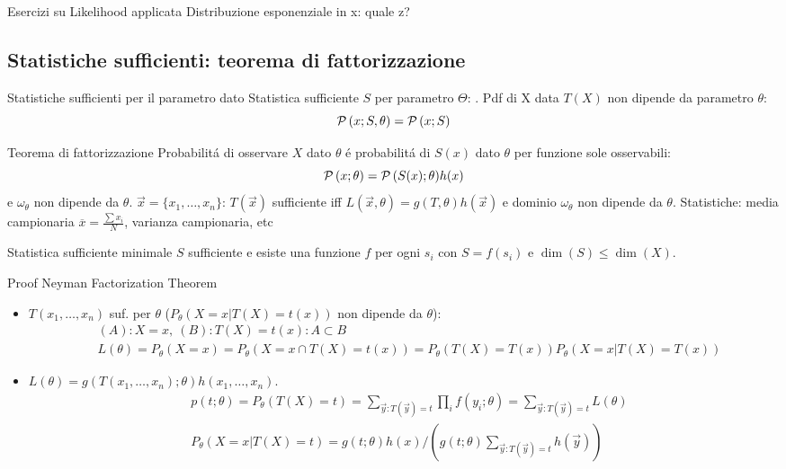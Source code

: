 \documentclass[asd-beamer.tex]{subfiles}
\begin{document}
\begin{frame}{Esercizi su Likelihood applicata}
Distribuzione esponenziale in x: quale z?
\end{frame}

\subsection{Statistiche sufficienti: teorema di fattorizzazione}

\begin{frame}{Statistiche sufficienti per il parametro dato}
Statistica sufficiente $S$ per parametro $\Theta$: . Pdf di X data $T(X)$ non dipende da parametro $\theta$:
\[\operatorname{\mathcal{P}}{(x;S,\theta)}=\operatorname{\mathcal{P}}{(x;S)}\]
\begin{block}{Teorema di fattorizzazione}
Probabilit\'a di osservare $X$ dato $\theta$ \'e probabilit\'a di $S(x)$ dato $\theta$ per funzione sole osservabili: \[\operatorname{\mathcal{P}}{(x;\theta)}=\operatorname{\mathcal{P}}{(S(x);\theta)}h(x)\] e $\omega_{\theta}$ non dipende da $\theta$. $\vec{x}=\{x_1,\ldots,x_n\}$: $T(\vec{x})$ sufficiente iff $L(\vec{x},\theta)=g(T,\theta)h(\vec{x})$ e dominio $\omega_{\theta}$ non dipende da $\theta$. Statistiche: media campionaria $\overline{x}=\frac{\sum x_i}{N}$, varianza campionaria, etc
\end{block}
\begin{block}{Statistica sufficiente minimale}
$S$ sufficiente e esiste una funzione $f$ per ogni $s_i$ con $S=f(s_i)$ e $\dim({S})\leq\dim{(X)}$.
\end{block}
\end{frame}

\begin{frame}{Proof Neyman Factorization Theorem}
\begin{itemize}
\item $T(x_1,\ldots,x_n)$ suf. per $\theta$ ($P_{\theta}(X=x|T(X)=t(x))$ non dipende da $\theta$):
\begin{align*}
&(A): X=x,\ (B): T(X)=t(x): A\subset B\\
&L(\theta)=P_{\theta}(X=x)=P_{\theta}(X=x\cap T(X)=t(x))=P_{\theta}(T(X)=T(x))P_{\theta}(X=x|T(X)=T(x))
\end{align*}
\item $L(\theta)=g(T(x_1,\ldots,x_n);\theta)h(x_1,\ldots,x_n)$.
\begin{align*}
&p(t;\theta)=P_{\theta}(T(X)=t)=\sum_{\vec{y}:T(\vec{y})=t}\prod_if(y_i;\theta)=\sum_{\vec{y}:T(\vec{y})=t}L(\theta)\\
&P_{\theta}(X=x|T(X)=t)=g(t;\theta)h(x)/(g(t;\theta)\sum_{\vec{y}:T(\vec{y})=t}h(\vec{y}))
\end{align*}
\end{itemize}
\end{frame}
\end{document}
